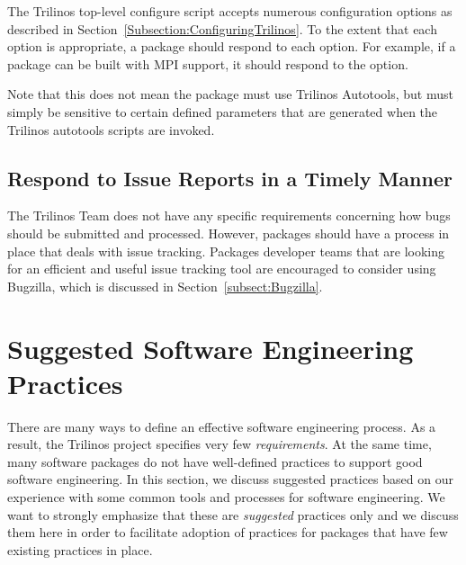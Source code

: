 \documentclass[12pt,relax]{TrilinosDevGuide}
\begin{document}
The Trilinos top-level configure script accepts numerous configuration
options as described in Section~\ref{Subsection:ConfiguringTrilinos}.
To the extent that each option is appropriate, a package should
respond to each option.  For example, if a package can be built with
MPI support, it should respond to the  option.

Note that this does not mean the package must use Trilinos Autotools,
but must simply be sensitive to certain defined parameters that are
generated when the Trilinos autotools scripts are invoked.

\subsection{Respond to Issue Reports in a Timely Manner}

The Trilinos Team does not have any specific requirements concerning how 
bugs should be submitted and processed.  However, packages should have a 
process in place that deals with issue tracking.  Packages developer teams 
that are looking for an efficient and useful issue tracking tool are 
encouraged to consider using Bugzilla, which is discussed in 
Section~\ref{subsect:Bugzilla}.

\section{Suggested Software Engineering Practices}
\label{Section:SuggestPractices}

\begin{minipage}[c]{\textwidth}

\begin{minipage}[l]{.6\textwidth}
There are many ways to define an effective software engineering
process.  As a result, the 
Trilinos project specifies very few {\it requirements}.  At the same time, 
many software packages do not have well-defined practices to support good 
software engineering.  In this section, we discuss suggested practices based 
on our experience with some common tools and processes for software 
engineering.  We want to strongly emphasize that these are {\it suggested} 
practices only and we discuss them here in order to facilitate adoption of 
practices for packages that have few existing practices in place.
\end{minipage}\hfill
{}
\end{minipage}
\end{document}
